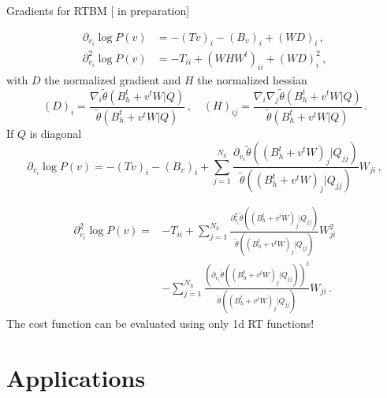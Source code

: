 \documentclass[10pt]{beamer}
\begin{document}
\begin{frame}{Gradients for RTBM \hfill \small [\cite{new} in preparation]}

    \begin{equation*}
        \begin{split}
         \partial_{v_i} \log{P(v)} &= - ( T v)_i - (B_v)_i + ( W D)_i\,,\\
         \partial^2_{v_i} \log{P(v)} &= - T _{ii} + (W H W^t)_{ii} + ( W D)^2_i\,,
       \end{split}   
       \end{equation*}
       with $D$ the normalized gradient and $H$ the normalized hessian 
       \begin{equation*}
           (D)_i = \frac{\nabla_i \tilde{\theta}(B^t_h+v^t W \vert Q)}{\tilde{\theta}(B^t_h+v^t W \vert Q)} 
           \,, \quad
           (H)_{ij} = \frac{\nabla_i \nabla_j \tilde{\theta}(B^t_h+v^t W \vert Q)}{\tilde{\theta}(B^t_h+v^t W \vert Q)}\,.
       \end{equation*}
       If $Q$ is diagonal 
       \begin{equation*}
        \partial_{v_i} \log{P(v)} = - ( T v)_i - (B_v)_i + \sum_{j=1}^{N_h} \frac{\partial_{v_i} \tilde{\theta}((B^t_h+v^t W)_j \vert Q_{jj})}{\tilde{\theta}((B^t_h+v^t W)_j \vert Q_{jj})} W_{ji}\,,
   \end{equation*}
   
   \begin{equation*}
   \begin{split}
        \partial_{v_i}^2 \log{P(v)} =& - T_{ii} + 
        \sum_{j=1}^{N_h} \frac{\partial^2_{v_i} \tilde{\theta}((B^t_h+v^t W)_j \vert Q_{jj})}
        {\tilde{\theta}((B^t_h+v^t W)_j \vert Q_{jj})} W_{ji}^2\\
        &
        - 
        \sum_{j=1}^{N_h} \frac{(\partial_{v_i} \tilde{\theta}((B^t_h+v^t W)_j \vert Q_{jj}))^2}
        {\tilde{\theta}((B^t_h+v^t W)_j \vert Q_{jj})} W_{ji}\,.
   \end{split}
   \end{equation*}
   The cost function can be evaluated using only 1d RT functions!
\end{frame}

\section{Applications}
\end{document}
